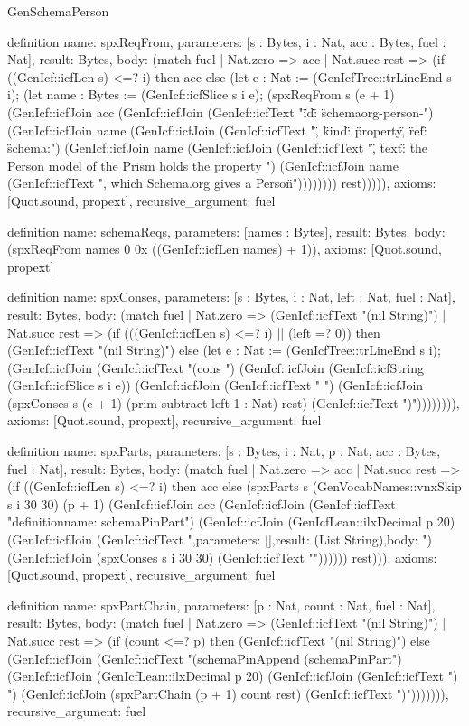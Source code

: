 \begin{lexlean}{GenSchemaPerson}
\begin{semanticmodule}
definition{
  name: spxReqFrom,
  parameters: [s : Bytes, i : Nat, acc : Bytes, fuel : Nat],
  result: Bytes,
  body: (match fuel
    | Nat.zero => acc
    | Nat.succ rest => (if ((GenIcf::icfLen s) <=? i) then acc else (let e : Nat := (GenIcfTree::trLineEnd s i); (let name : Bytes := (GenIcf::icfSlice s i e); (spxReqFrom s (e + 1) (GenIcf::icfJoin acc (GenIcf::icfJoin (GenIcf::icfText "{\"id\": \"schemaorg-person-") (GenIcf::icfJoin name (GenIcf::icfJoin (GenIcf::icfText "\", \"kind\": \"property\", \"ref\": \"schema:") (GenIcf::icfJoin name (GenIcf::icfJoin (GenIcf::icfText "\", \"text\": \"the Person model of the Prism holds the property ") (GenIcf::icfJoin name (GenIcf::icfText ", which Schema.org gives a Person\"}\n")))))))) rest))))),
  axioms: [Quot.sound, propext],
  recursive_argument: fuel
}

definition{
  name: schemaReqs,
  parameters: [names : Bytes],
  result: Bytes,
  body: (spxReqFrom names 0 0x ((GenIcf::icfLen names) + 1)),
  axioms: [Quot.sound, propext]
}

definition{
  name: spxConses,
  parameters: [s : Bytes, i : Nat, left : Nat, fuel : Nat],
  result: Bytes,
  body: (match fuel
    | Nat.zero => (GenIcf::icfText "(nil String)")
    | Nat.succ rest => (if (((GenIcf::icfLen s) <=? i) || (left =? 0)) then (GenIcf::icfText "(nil String)") else (let e : Nat := (GenIcfTree::trLineEnd s i); (GenIcf::icfJoin (GenIcf::icfText "(cons ") (GenIcf::icfJoin (GenIcf::icfString (GenIcf::icfSlice s i e)) (GenIcf::icfJoin (GenIcf::icfText " ") (GenIcf::icfJoin (spxConses s (e + 1) (prim subtract left 1 : Nat) rest) (GenIcf::icfText ")")))))))),
  axioms: [Quot.sound, propext],
  recursive_argument: fuel
}

definition{
  name: spxParts,
  parameters: [s : Bytes, i : Nat, p : Nat, acc : Bytes, fuel : Nat],
  result: Bytes,
  body: (match fuel
    | Nat.zero => acc
    | Nat.succ rest => (if ((GenIcf::icfLen s) <=? i) then acc else (spxParts s (GenVocabNames::vnxSkip s i 30 30) (p + 1) (GenIcf::icfJoin acc (GenIcf::icfJoin (GenIcf::icfText "definition{\n  name: schemaPinPart") (GenIcf::icfJoin (GenIcfLean::ilxDecimal p 20) (GenIcf::icfJoin (GenIcf::icfText ",\n  parameters: [],\n  result: (List String),\n  body: ") (GenIcf::icfJoin (spxConses s i 30 30) (GenIcf::icfText "\n}\n\n")))))) rest))),
  axioms: [Quot.sound, propext],
  recursive_argument: fuel
}

definition{
  name: spxPartChain,
  parameters: [p : Nat, count : Nat, fuel : Nat],
  result: Bytes,
  body: (match fuel
    | Nat.zero => (GenIcf::icfText "(nil String)")
    | Nat.succ rest => (if (count <=? p) then (GenIcf::icfText "(nil String)") else (GenIcf::icfJoin (GenIcf::icfText "(schemaPinAppend (schemaPinPart") (GenIcf::icfJoin (GenIcfLean::ilxDecimal p 20) (GenIcf::icfJoin (GenIcf::icfText ") ") (GenIcf::icfJoin (spxPartChain (p + 1) count rest) (GenIcf::icfText ")"))))))),
  recursive_argument: fuel
}


\end{semanticmodule}
\end{lexlean}

